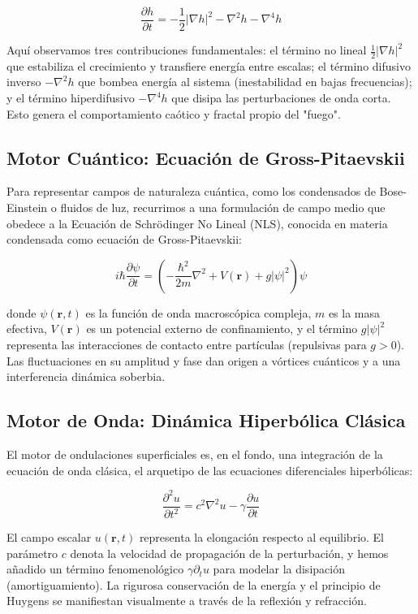 \documentclass[12pt, openany]{book}
\begin{document}
\begin{equation}
\frac{\partial h}{\partial t} = -\frac{1}{2} |\nabla h|^2 - \nabla^2 h - \nabla^4 h
\end{equation}

Aquí observamos tres contribuciones fundamentales: el término no lineal $\frac{1}{2} |\nabla h|^2$ que estabiliza el crecimiento y transfiere energía entre escalas; el término difusivo inverso $-\nabla^2 h$ que bombea energía al sistema (inestabilidad en bajas frecuencias); y el término hiperdifusivo $-\nabla^4 h$ que disipa las perturbaciones de onda corta. Esto genera el comportamiento caótico y fractal propio del "fuego".

\subsection{Motor Cuántico: Ecuación de Gross-Pitaevskii}
Para representar campos de naturaleza cuántica, como los condensados de Bose-Einstein o fluidos de luz, recurrimos a una formulación de campo medio que obedece a la Ecuación de Schrödinger No Lineal (NLS), conocida en materia condensada como ecuación de Gross-Pitaevskii:

\begin{equation}
i \hbar \frac{\partial \psi}{\partial t} = \left( -\frac{\hbar^2}{2m} \nabla^2 + V(\mathbf{r}) + g |\psi|^2 \right) \psi
\end{equation}

donde $\psi(\mathbf{r},t)$ es la función de onda macroscópica compleja, $m$ es la masa efectiva, $V(\mathbf{r})$ es un potencial externo de confinamiento, y el término $g |\psi|^2$ representa las interacciones de contacto entre partículas (repulsivas para $g > 0$). Las fluctuaciones en su amplitud y fase dan origen a vórtices cuánticos y a una interferencia dinámica soberbia.

\subsection{Motor de Onda: Dinámica Hiperbólica Clásica}
El motor de ondulaciones superficiales es, en el fondo, una integración de la ecuación de onda clásica, el arquetipo de las ecuaciones diferenciales hiperbólicas:

\begin{equation}
\frac{\partial^2 u}{\partial t^2} = c^2 \nabla^2 u - \gamma \frac{\partial u}{\partial t}
\end{equation}

El campo escalar $u(\mathbf{r},t)$ representa la elongación respecto al equilibrio. El parámetro $c$ denota la velocidad de propagación de la perturbación, y hemos añadido un término fenomenológico $\gamma \partial_t u$ para modelar la disipación (amortiguamiento). La rigurosa conservación de la energía y el principio de Huygens se manifiestan visualmente a través de la reflexión y refracción.
\end{document}
